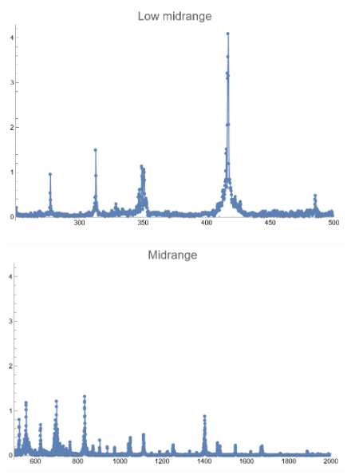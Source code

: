 \documentclass[12pt, letterpaper]{article}
\begin{document}
\begin{figure}[H]
  \centering
  \begin{minipage}{.5\textwidth}
    \centering
    \includegraphics[width=.9\linewidth]{imgs/Cancion10/lowmid.png}
    \label{fig:10d}
  \end{minipage}%
  \begin{minipage}{.5\textwidth}
    \centering
    \includegraphics[width=.9\linewidth]{imgs/Cancion10/mid.png}
    \label{fig:10e}
  \end{minipage}
\end{figure}
\end{document}
